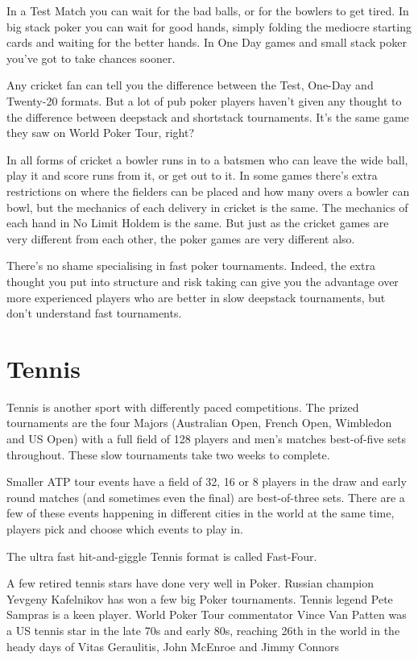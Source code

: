 In a Test Match you can wait for the bad balls, or for the bowlers to
get tired. In big stack poker you can wait for good hands, simply folding the
mediocre starting cards and waiting for the better hands. In One Day games
and small stack poker you've got to take chances sooner.

Any cricket fan can tell you the difference between the Test,
One-Day and Twenty-20 formats. But a lot of pub poker players haven't given any
thought to the difference between deepstack and shortstack
tournaments. It's the same game they saw on World Poker Tour,
right?

In all forms of cricket a bowler runs in to a batsmen who
can leave the wide ball, play it and score runs from it, or get out
to it. In some games there's extra restrictions on where the
fielders can be placed and how many overs a bowler
can bowl, but the mechanics of each delivery in cricket is the same.
The mechanics of each hand in No Limit Holdem is the same.
But just as the cricket games are very different from each other, the
poker games are very different also.

There's no shame specialising in fast poker tournaments. Indeed,
the extra thought you put into structure and risk taking can give
you the advantage over more experienced players who are better in
slow deepstack tournaments, but don't understand fast tournaments.

\section{Tennis}

Tennis is another sport with differently paced competitions.
The prized tournaments are the four Majors (Australian Open,
French Open, Wimbledon and US Open) with a full field of 128 players
and men's matches best-of-five sets throughout. These slow tournaments
take two weeks to complete.

Smaller ATP tour events have a field of 32, 16 or 8 players in the draw
and early round matches (and sometimes even the final) are best-of-three
sets. There are a few of these events happening in different cities in
the world at the same time, players pick and choose which events
to play in.

The ultra fast hit-and-giggle Tennis format is called Fast-Four.

A few retired tennis stars have done very well in Poker. Russian
champion Yevgeny Kafelnikov has won a few big Poker tournaments.
Tennis legend Pete Sampras is a keen player. World Poker Tour
commentator Vince Van Patten was a US tennis star in the late
70s and early 80s, reaching 26th in the world in the heady days
of Vitas Geraulitis, John McEnroe and Jimmy Connors

